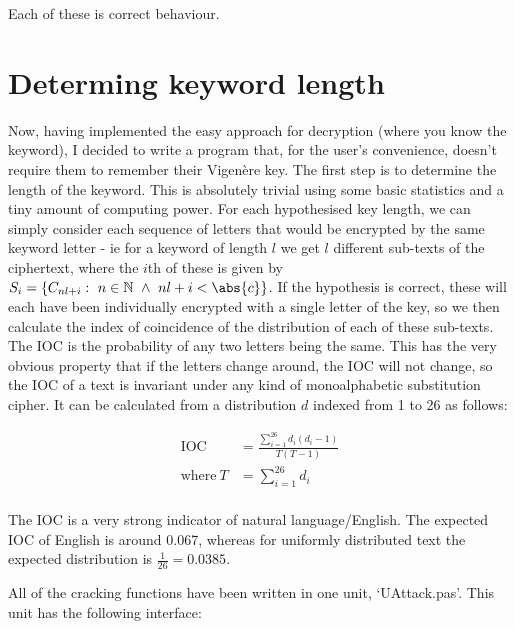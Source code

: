 \documentclass[fleqn,a4paper,11pt]{article}
\begin{document}
    Each of these is correct behaviour.

    \section{Determing keyword length}

    Now, having implemented the easy approach for decryption (where you know the
    keyword), I decided to write a program that, for the user's convenience,
    doesn't require them to remember their Vigen\`ere key. The first step is to
    determine the length of the keyword. This is absolutely trivial using some
    basic statistics and a tiny amount of computing power. For each hypothesised
    key length, we can simply consider each sequence of letters that would be
    encrypted by the same keyword letter - ie for a keyword of length \(l\) we
    get \(l\) different sub-texts of the ciphertext, where the \(i\)th of these
    is given by \(S_i = \{C_{nl + i}:\ n \in \mathbb{N} \ \land\ nl + i <
    \abs{c}\}\). If the hypothesis is correct, these will each have been
    individually encrypted with a single letter of the key, so  we then
    calculate the index of coincidence of the distribution of each of these
    sub-texts. The IOC is the probability of any two letters being the same.
    This has the very obvious property that if the letters change around, the
    IOC will not change, so the IOC of a text is invariant under any kind of
    monoalphabetic substitution cipher. It can be calculated from a distribution
    \(d\) indexed from 1 to 26 as follows:

\begin{align*}
    \text{IOC}\ &= \frac{\sum\limits_{i = 1}^{26} d_i (d_i - 1)}{T (T - 1)}\\
    \text{where}\ T &= \sum\limits_{i = 1}^{26} d_i\\
\end{align*}

    The IOC is a very strong indicator of natural language/English. The
    expected IOC of English is around 0.067, whereas for uniformly distributed
    text the expected distribution is \(\frac{1}{26} = 0.0385\).

    All of the cracking functions have been written in one unit, `UAttack.pas'.
    This unit has the following interface:
\end{document}
